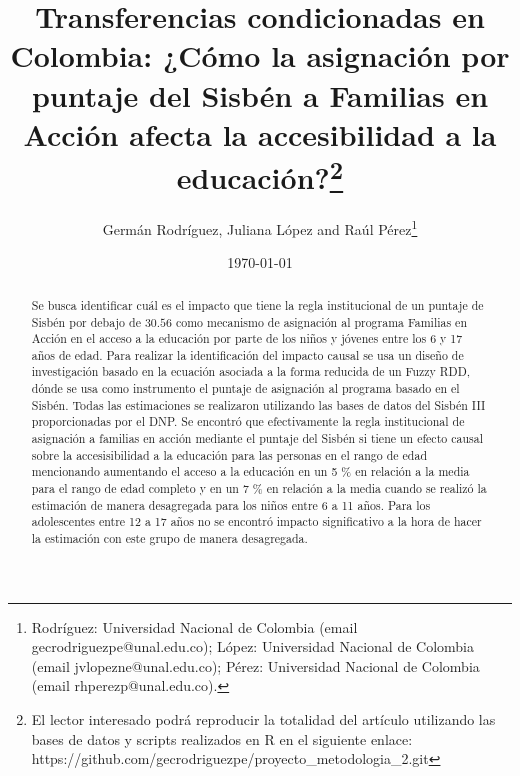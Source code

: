 \documentclass[AER]{AEA}
\begin{document}
\title{Transferencias condicionadas en Colombia: ¿Cómo la asignación por puntaje del Sisbén a Familias en Acción afecta la accesibilidad a la educación?\footnote{El lector interesado podrá reproducir la totalidad del artículo utilizando las bases de datos y scripts realizados en R en el siguiente enlace: https://github.com/gecrodriguezpe/proyecto\_metodologia\_2.git}}
\author{Germán Rodríguez, Juliana López and Raúl Pérez\thanks{Rodríguez: Universidad Nacional de Colombia (email gecrodriguezpe@unal.edu.co); López: Universidad Nacional de Colombia (email jvlopezne@unal.edu.co); Pérez: Universidad Nacional de Colombia (email rhperezp@unal.edu.co).}}
\date{\today}

\begin{abstract}
Se busca identificar cuál es el impacto que tiene la regla institucional de un puntaje de Sisbén por debajo de $30.56$ como mecanismo de asignación al programa Familias en Acción en el acceso a la educación por parte de los niños y jóvenes entre los 6 y 17 años de edad. Para realizar la identificación del impacto causal se usa un diseño de investigación basado en la ecuación asociada a la forma reducida de un Fuzzy RDD, dónde se usa como instrumento el puntaje de asignación al programa basado en el Sisbén. Todas las estimaciones se realizaron utilizando las bases de datos del Sisbén III proporcionadas por el DNP. Se encontró que efectivamente la regla institucional de asignación a familias en acción mediante el puntaje del Sisbén si tiene un efecto causal sobre la accesisibilidad a la educación para las personas en el rango de edad mencionando aumentando el acceso a la educación en un 5 \% en relación a la media para el rango de edad completo y en un 7 \% en relación a la media cuando se realizó la estimación de manera desagregada para los niños entre 6 a 11 años. Para los adolescentes entre 12 a 17 años no se encontró impacto significativo a la hora de hacer la estimación con este grupo de manera desagregada. 
\end{abstract}

\maketitle

\end{document}
